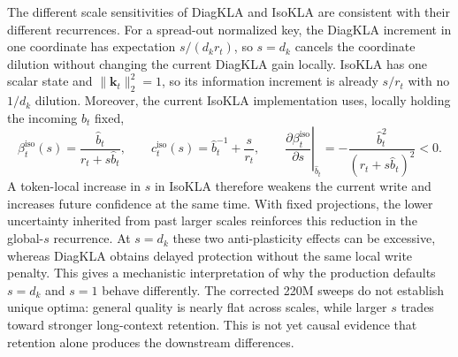 \documentclass[11pt]{article}
\newcommand{\vct}[1]{\boldsymbol{#1}}
\begin{document}
The different scale sensitivities of DiagKLA and IsoKLA are consistent with their different
recurrences. For a spread-out normalized key, the DiagKLA increment in one coordinate has expectation
$s/(d_kr_t)$, so $s=d_k$ cancels the coordinate dilution without changing the current DiagKLA
gain locally. IsoKLA has one scalar state and $\lVert\vct{k}_t\rVert_2^2=1$, so its information
increment is already $s/r_t$ with no $1/d_k$ dilution. Moreover, the current IsoKLA
implementation uses, locally holding the incoming $\widehat b_t$ fixed,
\begin{equation}
  \beta_t^{\mathrm{iso}}(s)
  =\frac{\widehat b_t}{r_t+s\widehat b_t},
  \qquad
  c_t^{\mathrm{iso}}(s)=\widehat b_t^{-1}+\frac{s}{r_t},
  \qquad
  \left.\frac{\partial\beta_t^{\mathrm{iso}}}{\partial s}\right|_{\widehat b_t}
  =-\frac{\widehat b_t^2}{(r_t+s\widehat b_t)^2}<0.
  \label{eq:discussion-iso-scale}
\end{equation}
A token-local increase in $s$ in IsoKLA therefore weakens the current write and increases future
confidence at the same time. With fixed projections, the lower uncertainty inherited from past
larger scales reinforces this reduction in the global-$s$ recurrence. At $s=d_k$ these two
anti-plasticity effects can be excessive, whereas DiagKLA obtains delayed protection without the
same local write penalty. This gives a mechanistic interpretation of why the production defaults
$s=d_k$ and $s=1$ behave differently. The corrected 220M sweeps do not establish unique optima:
general quality is nearly flat across scales, while larger $s$ trades toward stronger long-context
retention. This is not yet causal evidence that retention alone produces the downstream differences.
\end{document}
